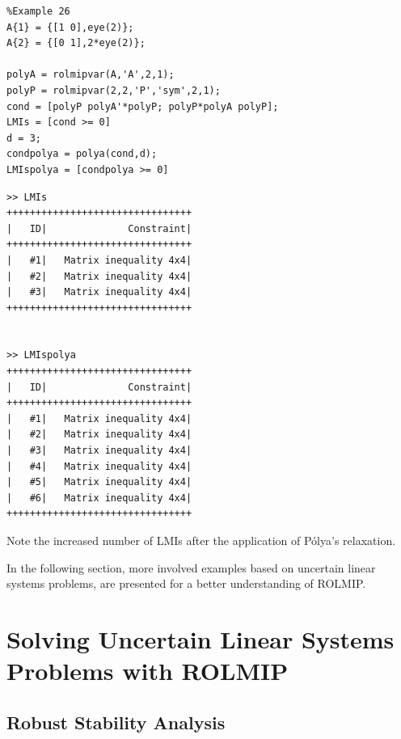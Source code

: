 \documentclass[english,11pt]{article}
\theoremstyle{break} \theorembodyfont{\small\rm}
\begin{document}
\begin{minipage}{11.5cm}
 \begin{lstlisting}
%Example 26
A{1} = {[1 0],eye(2)};
A{2} = {[0 1],2*eye(2)};

polyA = rolmipvar(A,'A',2,1);
polyP = rolmipvar(2,2,'P','sym',2,1);
cond = [polyP polyA'*polyP; polyP*polyA polyP];
LMIs = [cond >= 0]
d = 3;
condpolya = polya(cond,d);
LMIspolya = [condpolya >= 0]
 \end{lstlisting}
\end{minipage}
\vspace{0.2cm}

\begin{minipage}{9.2cm}
\begin{lstlisting}[rulecolor=\color{red}]
>> LMIs
++++++++++++++++++++++++++++++++
|   ID|              Constraint|
++++++++++++++++++++++++++++++++
|   #1|   Matrix inequality 4x4|
|   #2|   Matrix inequality 4x4|
|   #3|   Matrix inequality 4x4|
++++++++++++++++++++++++++++++++


>> LMIspolya
++++++++++++++++++++++++++++++++
|   ID|              Constraint|
++++++++++++++++++++++++++++++++
|   #1|   Matrix inequality 4x4|
|   #2|   Matrix inequality 4x4|
|   #3|   Matrix inequality 4x4|
|   #4|   Matrix inequality 4x4|
|   #5|   Matrix inequality 4x4|
|   #6|   Matrix inequality 4x4|
++++++++++++++++++++++++++++++++
\end{lstlisting}
\end{minipage}
\vspace{0.2cm}
\vspace{0.2cm}

Note the increased number of LMIs after the application of P\'{o}lya's relaxation.

% 

In the following section, more involved examples based on uncertain linear systems problems, are presented for a better understanding of ROLMIP.

\section{Solving Uncertain Linear Systems Problems with ROLMIP}

\subsection{Robust Stability Analysis}
\end{document}
